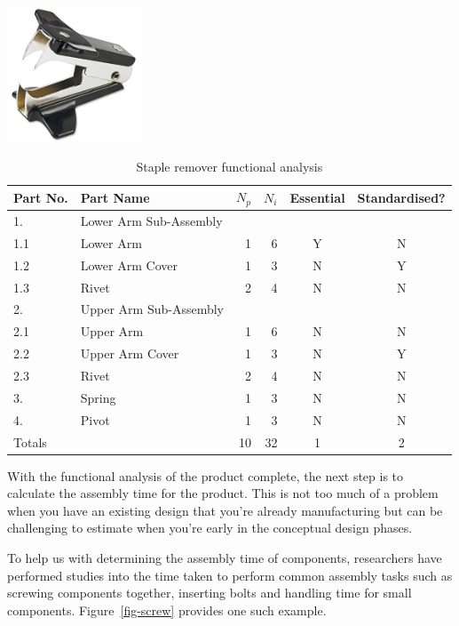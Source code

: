\begin{table}[h!]
  \centering
  \includegraphics[width=0.3\textwidth]{figs/staple-remover.jpg} \\
  \footnotesize
  \begin{tabular}{l l r r c c}
    \toprule
      Part No. & Part Name & $N_p$ & $N_i$ & Essential &Standardised? \\
    \midrule
      1. & Lower Arm Sub-Assembly \\
    \midrule
      1.1 & Lower Arm & 1 & 6 & Y & N \\
      1.2 & Lower Arm Cover & 1 & 3 & N & Y \\
      1.3 & Rivet & 2 & 4 & N & N \\
    \midrule
      2. & Upper Arm Sub-Assembly & & \\
    \midrule
      2.1 & Upper Arm & 1 & 6 & N & N \\
      2.2 & Upper Arm Cover & 1 & 3 & N & Y \\
      2.3 & Rivet & 2 & 4 & N & N \\
    \midrule
      3. & Spring & 1 & 3 & N & N \\
    \midrule
      4. & Pivot & 1 & 3 & N & N \\
    \midrule
      Totals & & 10 & 32 & 1 & 2 \\
    \bottomrule
  \end{tabular}
  \caption{Staple remover functional analysis}\label{tbl-parts}
\end{table}


With the functional analysis of the product complete, the next step is to calculate the assembly time for the product. This is not too much of a problem when you have an existing design that you're already manufacturing but can be challenging to estimate when you're early in the conceptual design phases.

To help us with determining the assembly time of components, researchers have performed studies into the time taken to perform common assembly tasks such as screwing components together, inserting bolts and handling time for small components. Figure~\ref{fig-screw} provides one such example.

